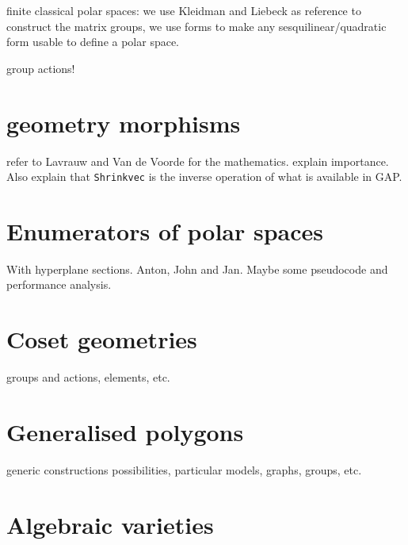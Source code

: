 \documentclass{article}
\begin{document}
finite classical polar spaces: we use Kleidman and Liebeck as reference to construct the matrix groups, we use forms to make 
any sesquilinear/quadratic form usable to define a polar space. 

group actions!

\section{geometry morphisms}

refer to Lavrauw and Van de Voorde for the mathematics. explain importance. Also explain that \verb+Shrinkvec+ is the inverse operation of what is available in GAP.

\section{Enumerators of polar spaces}
With hyperplane sections. Anton, John and Jan. Maybe some pseudocode and performance analysis.

\section{Coset geometries}

groups and actions, elements, etc.

\section{Generalised polygons}

generic constructions possibilities, particular models, graphs, groups, etc.

\section{Algebraic varieties}


\end{document}
